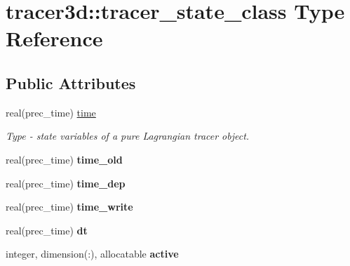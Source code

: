 \hypertarget{structtracer3d_1_1tracer__state__class}{}\section{tracer3d\+:\+:tracer\+\_\+state\+\_\+class Type Reference}
\label{structtracer3d_1_1tracer__state__class}
\subsection*{Public Attributes}
\begin{DoxyCompactItemize}
\item 
\mbox{\label{structtracer3d_1_1tracer__state__class_ad2c406b0c70535b9eefc6a58b5155228}} 
real(prec\+\_\+time) \mbox{\hyperlink{structtracer3d_1_1tracer__state__class_ad2c406b0c70535b9eefc6a58b5155228}{time}}
\begin{DoxyCompactList}\small\item\em Type -\/ state variables of a pure Lagrangian tracer object. \end{DoxyCompactList}\item 
\mbox{\label{structtracer3d_1_1tracer__state__class_aff3f9a1333320499aae96ab6e0d31ded}} 
real(prec\+\_\+time) {\bfseries time\+\_\+old}
\item 
\mbox{\label{structtracer3d_1_1tracer__state__class_a45e7a5c8c9fb20695d004397ab2ceaee}} 
real(prec\+\_\+time) {\bfseries time\+\_\+dep}
\item 
\mbox{\label{structtracer3d_1_1tracer__state__class_a4778a9a01005ff19c20dbba6c081c4b9}} 
real(prec\+\_\+time) {\bfseries time\+\_\+write}
\item 
\mbox{\label{structtracer3d_1_1tracer__state__class_aff1762f7b19fc4480e8ab2562ccbb9e6}} 
real(prec\+\_\+time) {\bfseries dt}
\item 
\mbox{\label{structtracer3d_1_1tracer__state__class_ab350c849df637157d07b05d6df6cd035}} 
integer, dimension(\+:), allocatable {\bfseries active}

\end{DoxyCompactItemize}
